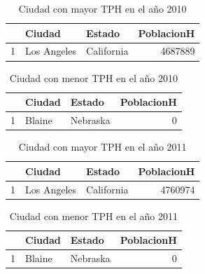 \begin{table}[ht]
\centering
\begin{tabular}{rllr}
  \hline
 & Ciudad & Estado & PoblacionH \\ 
  \hline
1 & Los Angeles & California & 4687889 \\ 
   \hline
\end{tabular}
\caption{Ciudad con mayor TPH en el año 2010} 
\end{table}


\begin{table}[ht]
\centering
\begin{tabular}{rllr}
  \hline
 & Ciudad & Estado & PoblacionH \\ 
  \hline
1 & Blaine & Nebraska &   0 \\ 
   \hline
\end{tabular}
\caption{Ciudad con menor TPH en el año 2010} 
\end{table}


\begin{table}[ht]
\centering
\begin{tabular}{rllr}
  \hline
 & Ciudad & Estado & PoblacionH \\ 
  \hline
1 & Los Angeles & California & 4760974 \\ 
   \hline
\end{tabular}
\caption{Ciudad con mayor TPH en el año 2011} 
\end{table}


\begin{table}[ht]
\centering
\begin{tabular}{rllr}
  \hline
 & Ciudad & Estado & PoblacionH \\ 
  \hline
1 & Blaine & Nebraska &   0 \\ 
   \hline
\end{tabular}
\caption{Ciudad con menor TPH en el año 2011} 
\end{table}


